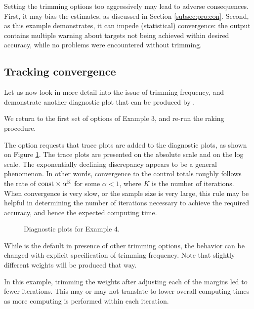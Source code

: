Setting the trimming options too aggressively may lead to adverse
consequences. First, it may bias the estimates, as discussed in Section 
\ref{subsec:pro:con}.
Second, as this example demonstrates, it can impede (statistical) convergence:
the output contains multiple warning about targets not being achieved
within desired accuracy, while no problems were encountered without trimming.

\subsection{Tracking convergence}
\label{subsec:example:trace}

Let us now look in more detail into the issue of trimming frequency,
and demonstrate another diagnostic plot that can be produced by
.

\begin{stexample}[Example 4]

We return to the first set of options of Example 3, and
re-run the raking procedure.

\begin{stlog}
\nullskip
\end{stlog}

The option  requests that trace plots are added to
the diagnostic plots, as shown on Figure \ref{fig:example4:sometimes}.
The trace plots are presented on the absolute scale and on the log scale.
The exponentially declining discrepancy appears to be a general phenomenon.
In other words, convergence to the control totals roughly follows
the rate of $\rm{const} \times \alpha^K$ for some $\alpha<1$, where $K$ is
the number of iterations. When convergence is very slow, or the sample
size is very large, this rule may be helpful in determining the number
of iterations necessary to achieve the required accuracy, and hence
the expected computing time.

\begin{figure}[h!]
\begin{center}
\end{center}
\caption{Diagnostic plots for Example 4.}
\label{fig:example4:sometimes}
\end{figure}

While  is the default in presence
of other trimming options, the behavior can be changed
with explicit specification of trimming frequency. Note that slightly
different weights will be produced that way.

\begin{stlog}
\nullskip
\end{stlog}

In this example, trimming the weights after adjusting each of the margins
led to fewer iterations. This may or may not translate to lower overall
computing times as more computing is performed within each iteration.

\end{stexample}

